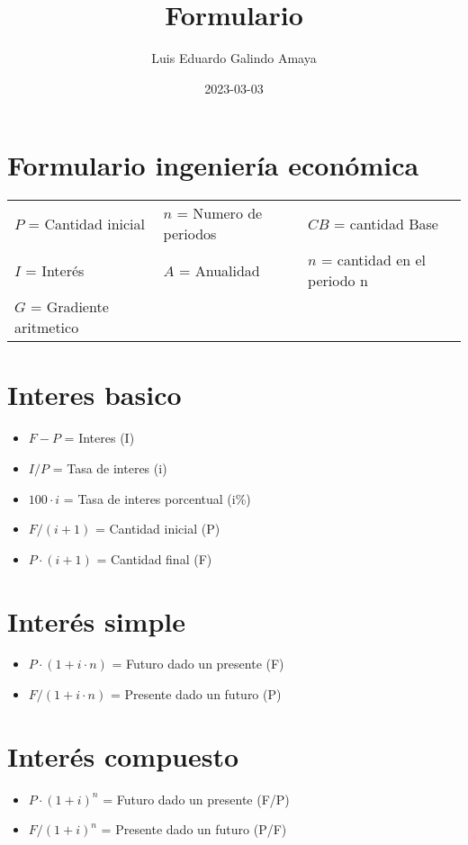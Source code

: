 \documentclass[11pt]{article}
\author{Luis Eduardo Galindo Amaya}
\date{2023-03-03}
\title{Formulario}
\begin{document}
\section*{Formulario ingeniería económica}
\label{sec:org067f403}
\begin{center}
\begin{tabular}{lll}
\(P\) = Cantidad inicial & \(n\) = Numero de periodos & \(CB\) = cantidad Base\\
\(I\) = Interés & \(A\) = Anualidad & \(n\) = cantidad en el periodo n\\
\(G\) = Gradiente aritmetico &  & \\
\end{tabular}

\end{center}

\section*{Interes basico}
\label{sec:orgb678703}
\begin{itemize}
\item \(F-P\) = Interes (I)
\item \(I / P\) = Tasa de interes (i)
\item \(100 \cdot i\) = Tasa de interes porcentual (i\%)
\item \(F / (i+1)\) = Cantidad inicial (P)
\item \(P\cdot (i+ 1)\) = Cantidad final (F)
\end{itemize}

\section*{Interés simple}
\label{sec:org3a643ed}
\begin{itemize}
\item \(P\cdot(1+i\cdot n)\) = Futuro dado un presente (F)
\item \(F / (1+i\cdot n)\) = Presente dado un futuro (P)
\end{itemize}

\section*{Interés compuesto}
\label{sec:org631030c}
\begin{itemize}
\item \(P\cdot (1+i)^n\) = Futuro dado un presente (F/P)
\item \(F / (1+i)^n\) = Presente dado un futuro (P/F)
\end{itemize}
\end{document}
